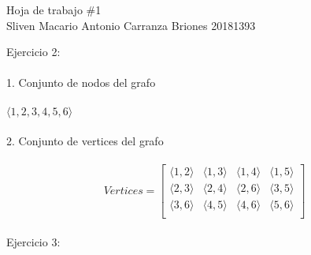 \documentclass[20pt,a4paper]{article}
\author{Sliven Carranza}
\begin{document}
\begin{center}
        \huge{Hoja de trabajo \#1} \\
        \large{Sliven Macario Antonio Carranza Briones 20181393} \\
\end{center} 
Ejercicio 2: \\ \\
1. Conjunto de nodos del grafo\\ \\ 
$\langle 1 , 2 , 3 , 4 , 5 , 6 \rangle$  \\\\

2. Conjunto de vertices  del grafo\\ \\
\[
Vertices= \begin{bmatrix}
\langle 1, 2 \rangle & \langle 1, 3 \rangle & \langle 1, 4 \rangle & \langle 1, 5 \rangle \\ 
\langle 2, 3 \rangle & \langle 2, 4 \rangle & \langle 2, 6 \rangle & \langle 3,5  \rangle \\ 
\langle 3, 6 \rangle & \langle 4, 5 \rangle & \langle 4, 6 \rangle & \langle 5,6  \rangle \\ 
\end{bmatrix}
 \] \\
 Ejercicio  3: \\ \\
 
\end{document}
